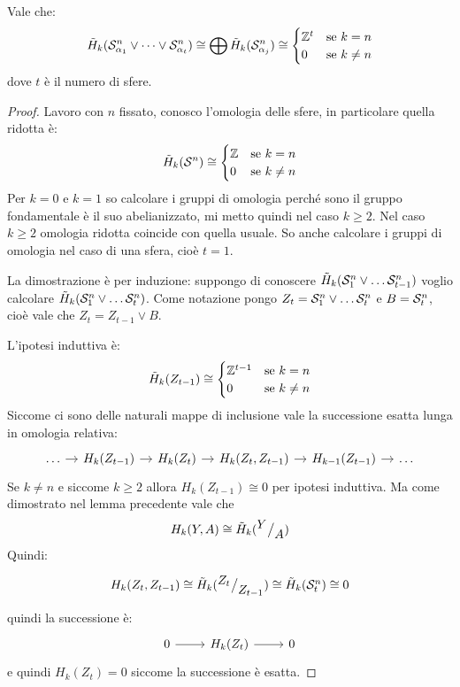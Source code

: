 \begin{lemma}
  Vale che:
  \[
    \tilde{H}_k(\mathcal{S}^{n}_{\alpha_1} \vee \dots \vee \mathcal{S}^{n}_{\alpha_t}) \cong \bigoplus \tilde{H}_k(\mathcal{S}^{n}_{\alpha_j}) \cong
    \begin{cases}
      \mathbb{Z}^t & \text{se $ k = n $} \\
      0 & \text{se $ k \not =  n $}
    \end{cases}
  \]
  dove $ t $ è il numero di sfere.
\end{lemma}
\begin{proof}
  Lavoro con $ n $ fissato, conosco l'omologia delle sfere,
  in particolare quella ridotta è:
  \[
    \tilde{H}_k(\mathcal{S}^{n}) \cong
    \begin{cases}
      \mathbb{Z}     & \text{se } k = n \\
      0      & \text{se } k \not = n
    \end{cases}
  \]
  Per $ k = 0 $ e $ k = 1 $ so calcolare i gruppi di omologia perché sono
  il gruppo fondamentale è il suo abelianizzato,
  mi metto quindi nel caso $ k \geq 2 $.
  Nel caso $ k \geq 2 $ omologia ridotta coincide con quella usuale.
  So anche calcolare i gruppi di omologia nel caso di una sfera,
  cioè $ t = 1 $.

  La dimostrazione è per induzione:
  suppongo di conoscere $ \tilde{H}_k(\mathcal{S}^{n}_1 \vee \dots \mathcal{S}^{n}_{t-1}) $
  voglio calcolare $ \tilde{H}_k(\mathcal{S}^{n}_1 \vee \dots \mathcal{S}^{n}_t) $.
  Come notazione pongo $ Z_t = \mathcal{S}^{n}_1 \vee \dots \mathcal{S}^{n}_t $ e $ B = \mathcal{S}^{n}_t $,
  cioè vale che $ Z_t = Z_{t-1} \vee B $.

  L'ipotesi induttiva è:
  \[
    \tilde{H}_k(Z_{t-1}) \cong
    \begin{cases}
      \mathbb{Z}^{t-1} & \text{se $ k = n $} \\
      0 & \text{se $ k \not = n $}
    \end{cases}
  \]
  Siccome ci sono delle naturali mappe di inclusione vale
  la successione esatta lunga in omologia relativa:
  \[
    \begin{tikzcd}[nodes={column sep=10pt}]
      \dots \rar & H_k(Z_{t-1}) \rar & H_k(Z_t) \rar & H_k(Z_t, Z_{t-1}) \rar & H_{k-1}(Z_{t-1}) \rar & \dots
    \end{tikzcd}
  \]
  Se $ k \not = n $ e siccome $ k \geq 2 $ allora $ H_k(Z_{t-1}) \cong 0 $ per ipotesi induttiva.
  Ma come dimostrato nel lemma precedente vale che
  \[
    H_k(Y,A) \cong \tilde{H}_k({^{\textstyle Y}\big/_{\textstyle A}})
  \]
  Quindi:
  \[
    \begin{tikzcd}
      H_k(Z_t, Z_{t-1}) \cong \tilde{H}_k(\quot{Z_t}{Z_{t-1}}) \cong \tilde{H}_k(\Sph{n}_t) \cong 0 %
    \end{tikzcd}
  \]
  quindi la successione è:
  \[
    \begin{tikzcd}
      0 \rar   & H_k(Z_t) \rar  & 0
    \end{tikzcd}
  \]
  e quindi $ H_{k}(Z_t) = 0 $ siccome la successione è esatta.


\end{proof}
